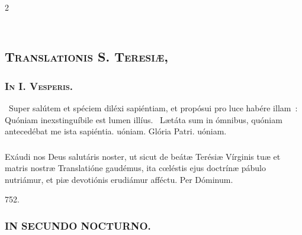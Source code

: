 \documentclass[9pt,twoside]{extarticle}
\begin{document}
\begin{multicols}{2}
\subsection*{\center \textsc{\\
Translationis S. Teresiæ,}}
\subsubsection*{\center {}}

\begin{tightlist}{}
\item {}
\end{tightlist}
\subsubsection*{\center \textsc{In I. Vesperis.}}
\begin{tightlist}{}
\item {}~Super salútem et spéciem diléxi sapiéntiam, et propósui pro luce habére illam~: \textred{*} Quóniam inexstinguíbile est lumen illíus. ~Lætáta sum in ómnibus, quóniam antecedébat me ista sapiéntia. uóniam. Glória Patri. uóniam.
\end{tightlist}

\subsubsection*{\center {}}
\lettrine{E}xáudi nos Deus salutáris noster, ut sicut de beátæ Terésiæ Vírginis tuæ et matris nostræ Translatióne gaudémus, ita cœléstis ejus doctrínæ pábulo nutriámur, et piæ devotiónis erudiámur afféctu. Per Dóminum.

\begin{tightlist}{}
\item {} 752.
\item {}
\end{tightlist}

\subsubsection*{\center \textsc{IN SECUNDO NOCTURNO.}}

\end{multicols}
\end{document}

